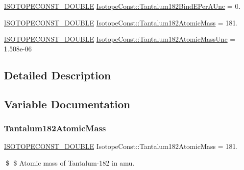 \begin{DoxyCompactItemize}
\mbox{\hyperlink{group___isotope_const-_macros_ga8f45a7272ce02c0b4c65c44636ed719a}{I\+S\+O\+T\+O\+P\+E\+C\+O\+N\+S\+T\+\_\+\+D\+O\+U\+B\+LE}} \mbox{\hyperlink{group___isotope_const-_tantalum-_ta182_gac6af31f91bc873974602e7710b2c0096}{Isotope\+Const\+::\+Tantalum182\+Bind\+E\+Per\+A\+Unc}} = 0.
\item 
\mbox{\hyperlink{group___isotope_const-_macros_ga8f45a7272ce02c0b4c65c44636ed719a}{I\+S\+O\+T\+O\+P\+E\+C\+O\+N\+S\+T\+\_\+\+D\+O\+U\+B\+LE}} \mbox{\hyperlink{group___isotope_const-_tantalum-_ta182_ga51c476224eef425249d65af9e61acc05}{Isotope\+Const\+::\+Tantalum182\+Atomic\+Mass}} = 181.
\item 
\mbox{\hyperlink{group___isotope_const-_macros_ga8f45a7272ce02c0b4c65c44636ed719a}{I\+S\+O\+T\+O\+P\+E\+C\+O\+N\+S\+T\+\_\+\+D\+O\+U\+B\+LE}} \mbox{\hyperlink{group___isotope_const-_tantalum-_ta182_gafc10a0b6993f13615184a1b7cb6ac022}{Isotope\+Const\+::\+Tantalum182\+Atomic\+Mass\+Unc}} = 1.\+508e-\/06
\end{DoxyCompactItemize}


\subsection{Detailed Description}


\subsection{Variable Documentation}
\mbox{\label{group___isotope_const-_tantalum-_ta182_ga51c476224eef425249d65af9e61acc05}} 
\subsubsection{\texorpdfstring{Tantalum182\+Atomic\+Mass}{Tantalum182AtomicMass}}
{\footnotesize\ttfamily \mbox{\hyperlink{group___isotope_const-_macros_ga8f45a7272ce02c0b4c65c44636ed719a}{I\+S\+O\+T\+O\+P\+E\+C\+O\+N\+S\+T\+\_\+\+D\+O\+U\+B\+LE}} Isotope\+Const\+::\+Tantalum182\+Atomic\+Mass = 181.}

\$ \$ Atomic mass of Tantalum-\/182 in amu. \mbox{\label{group___isotope_const-_tantalum-_ta182_gafc10a0b6993f13615184a1b7cb6ac022}} 

